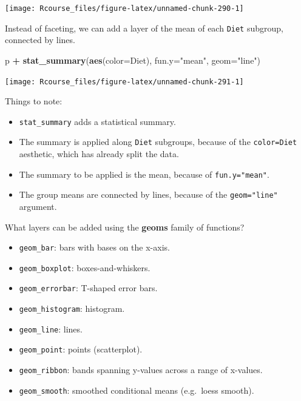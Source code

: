 \documentclass[]{book}
\newenvironment{Shaded}{\begin{snugshade}}{\end{snugshade}}
\newcommand{\KeywordTok}[1]{\textcolor[rgb]{0.13,0.29,0.53}{\textbf{#1}}}
\newcommand{\DataTypeTok}[1]{\textcolor[rgb]{0.13,0.29,0.53}{#1}}
\newcommand{\StringTok}[1]{\textcolor[rgb]{0.31,0.60,0.02}{#1}}
\newcommand{\OperatorTok}[1]{\textcolor[rgb]{0.81,0.36,0.00}{\textbf{#1}}}
\newcommand{\NormalTok}[1]{#1}
\providecommand{\tightlist}{%
  \setlength{\itemsep}{0pt}\setlength{\parskip}{0pt}}
\theoremstyle{definition}
\theoremstyle{definition}
\theoremstyle{definition}
\theoremstyle{remark}
\begin{document}
\texttt{[image: Rcourse\_files/figure-latex/unnamed-chunk-290-1]}

Instead of faceting, we can add a layer of the mean of each
\texttt{Diet} subgroup, connected by lines.

\begin{Shaded}
\begin{Highlighting}[]
\NormalTok{p }\OperatorTok{+}\StringTok{ }\KeywordTok{stat_summary}\NormalTok{(}\KeywordTok{aes}\NormalTok{(}\DataTypeTok{color=}\NormalTok{Diet), }\DataTypeTok{fun.y=}\StringTok{"mean"}\NormalTok{, }\DataTypeTok{geom=}\StringTok{"line"}\NormalTok{)}
\end{Highlighting}
\end{Shaded}

\texttt{[image: Rcourse\_files/figure-latex/unnamed-chunk-291-1]}

Things to note:

\begin{itemize}
\tightlist
\item
  \texttt{stat\_summary} adds a statistical summary.
\item
  The summary is applied along \texttt{Diet} subgroups, because of the
  \texttt{color=Diet} aesthetic, which has already split the data.
\item
  The summary to be applied is the mean, because of
  \texttt{fun.y="mean"}.
\item
  The group means are connected by lines, because of the
  \texttt{geom="line"} argument.
\end{itemize}

What layers can be added using the \textbf{geoms} family of functions?

\begin{itemize}
\tightlist
\item
  \texttt{geom\_bar}: bars with bases on the x-axis.
\item
  \texttt{geom\_boxplot}: boxes-and-whiskers.
\item
  \texttt{geom\_errorbar}: T-shaped error bars.
\item
  \texttt{geom\_histogram}: histogram.
\item
  \texttt{geom\_line}: lines.
\item
  \texttt{geom\_point}: points (scatterplot).
\item
  \texttt{geom\_ribbon}: bands spanning y-values across a range of
  x-values.
\item
  \texttt{geom\_smooth}: smoothed conditional means (e.g.~loess smooth).
\end{itemize}
\end{document}
